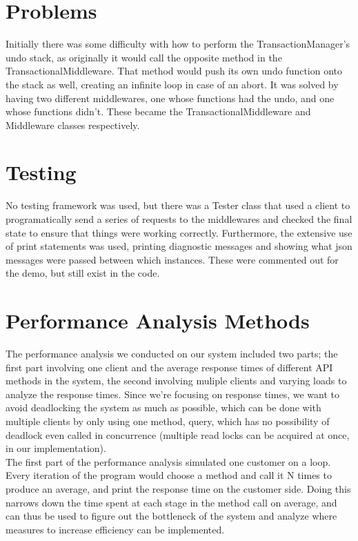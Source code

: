 \documentclass[letterpaper,12pt]{article}
\begin{document}
	\section{Problems}

	Initially there was some difficulty with how to perform the TransactionManager's undo stack, as originally it would call the opposite method in the TransactionalMiddleware. That method would push its own undo function onto the stack as well, creating an infinite loop in case of an abort. It was solved by having two different middlewares, one whose functions had the undo, and one whose functions didn't. These became the TransactionalMiddleware and Middleware classes respectively. 

	\section{Testing}

	No testing framework was used, but there was a Tester class that used a client to programatically send a series of requests to the middlewares and checked the final state to ensure that things were working correctly. Furthermore, the extensive use of print statements was used, printing diagnostic messages and showing what json messages were passed between which instances. These were commented out for the demo, but still exist in the code. 
	
	\section{Performance Analysis Methods}
	
	The performance analysis we conducted on our system included two parts; the first part involving one client and the average response times of different API methods in the system, the second involving muliple clients and varying loads to analyze the response times. Since we're focusing on response times, we want to avoid deadlocking the system as much as possible, which can be done with multiple clients by only using one method, query, which has no possibility of deadlock even called in concurrence (multiple read locks can be acquired at once, in our implementation). \\
	
	The first part of the performance analysis simulated one customer on a loop. Every iteration of the program would choose a method and call it N times to produce an average, and print the response time on the customer side. Doing this narrows down the time spent at each stage in the method call on average, and can thus be used to figure out the bottleneck of the system and analyze where measures to increase efficiency can be implemented.\\
	
\end{document}
